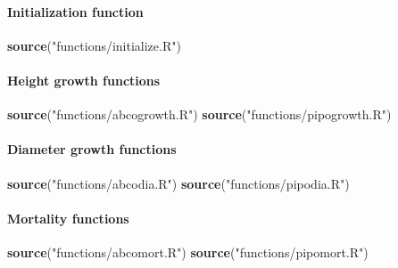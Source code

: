 \documentclass[]{article}
\newenvironment{Shaded}{\begin{snugshade}}{\end{snugshade}}
\newcommand{\KeywordTok}[1]{\textcolor[rgb]{0.13,0.29,0.53}{\textbf{#1}}}
\newcommand{\StringTok}[1]{\textcolor[rgb]{0.31,0.60,0.02}{#1}}
\newcommand{\NormalTok}[1]{#1}
\let\oldparagraph\paragraph
\renewcommand{\paragraph}[1]{\oldparagraph{#1}\mbox{}}
\begin{document}
\paragraph{Initialization function}\label{initialization-function}

\begin{Shaded}
\begin{Highlighting}[]
\KeywordTok{source}\NormalTok{(}\StringTok{"functions/initialize.R"}\NormalTok{)}
\end{Highlighting}
\end{Shaded}

\paragraph{Height growth functions}\label{height-growth-functions}

\begin{Shaded}
\begin{Highlighting}[]
\KeywordTok{source}\NormalTok{(}\StringTok{"functions/abcogrowth.R"}\NormalTok{)}
\KeywordTok{source}\NormalTok{(}\StringTok{"functions/pipogrowth.R"}\NormalTok{)}
\end{Highlighting}
\end{Shaded}

\paragraph{Diameter growth functions}\label{diameter-growth-functions}

\begin{Shaded}
\begin{Highlighting}[]
\KeywordTok{source}\NormalTok{(}\StringTok{"functions/abcodia.R"}\NormalTok{)}
\KeywordTok{source}\NormalTok{(}\StringTok{"functions/pipodia.R"}\NormalTok{)}
\end{Highlighting}
\end{Shaded}

\paragraph{Mortality functions}\label{mortality-functions}

\begin{Shaded}
\begin{Highlighting}[]
\KeywordTok{source}\NormalTok{(}\StringTok{"functions/abcomort.R"}\NormalTok{)}
\KeywordTok{source}\NormalTok{(}\StringTok{"functions/pipomort.R"}\NormalTok{)}
\end{Highlighting}
\end{Shaded}
\end{document}
